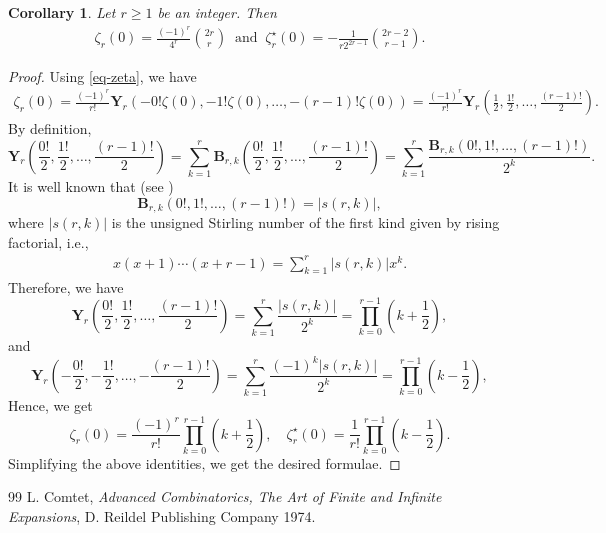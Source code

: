 \documentclass[10pt,a4paper]{amsart}
\newtheorem{cor}{Corollary}
\begin{document}
\begin{cor}\label{cor-value-zero}
Let $r\geq 1$ be an integer. Then  
\begin{align}\label{eq-zero}
\zeta_r(0)=\frac{(-1)^r}{4^r}\binom{2r}{r}\ \text{ and } \
\zeta^{\star}_r(0)=-\frac{1}{r2^{2r-1}}\binom{2r-2}{r-1}.
\end{align}
\end{cor}

\begin{proof}
Using \eqref{eq-zeta}, we have
\begin{align*}
\zeta_{r}(0)=\frac{(-1)^r}{r!}{\mathbf{Y}_r\left(-0!\zeta(0), -1!\zeta(0),\ldots,-(r-1)!\zeta(0)\right)}
=\frac{(-1)^r}{r!}\mathbf{Y}_r\left(\frac{1}{2}, \frac{1!}{2}, \ldots, \frac{(r-1)!}{2}\right).
\end{align*}
By definition,
$$
\mathbf{Y}_r\left(\frac{0!}{2}, \frac{1!}{2}, \ldots, \frac{(r-1)!}{2}\right)=\sum_{k=1}^{r}\mathbf{B}_{r,k}\left(\frac{0!}{2}, \frac{1!}{2},\ldots, \frac{(r-1)!}{2}\right)=\sum_{k=1}^{r}\frac{\mathbf{B}_{r,k}\left({0!}, {1!},\ldots, {(r-1)!}\right)}{2^k}.
$$
It is well known that (see \cite[Chapter 5]{L})
$$
\mathbf{B}_{r,k}\left({0!}, {1!},\ldots, {(r-1)!}\right)=|s(r,k)|,
$$
where $|s(r,k)|$ is the unsigned Stirling number of the first kind given by rising factorial, i.e.,
\begin{align}\label{gen-stirling}
x\left(x+1\right)\cdots \left(x+r-1\right)=\sum_{k=1}^{r}{|s(r,k)|}{x^k}.
\end{align}
Therefore, we have
$$
\mathbf{Y}_r\left(\frac{0!}{2}, \frac{1!}{2}, \ldots, \frac{(r-1)!}{2}\right)=\sum_{k=1}^{r}\frac{|s(r,k)|}{2^k}=\prod_{k=0}^{r-1}\left(k+\frac{1}{2}\right),
$$
and
$$
\mathbf{Y}_r\left(-\frac{0!}{2}, -\frac{1!}{2}, \ldots, -\frac{(r-1)!}{2}\right)=\sum_{k=1}^{r}\frac{(-1)^k|s(r,k)|}{2^k}=\prod_{k=0}^{r-1}\left(k-\frac{1}{2}\right),
$$
Hence, we get
$$
\zeta_r(0)=\frac{(-1)^r}{r!}\prod_{k=0}^{r-1}\left(k+\frac{1}{2}\right), \quad \zeta^{\star}_r(0)=\frac{1}{r!}\prod_{k=0}^{r-1}\left(k-\frac{1}{2}\right).
$$
Simplifying the above identities, we get the desired formulae.
\end{proof}

\begin{thebibliography}{99}
 L. Comtet, {\it Advanced Combinatorics, The Art of Finite and Infinite Expansions}, D. Reildel Publishing Company 1974.
\end{thebibliography}
\end{document}
